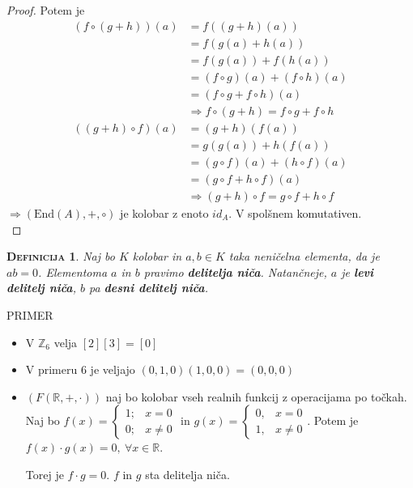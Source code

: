 \documentclass[a4paper,12pt]{article}
\newtheorem*{definicija}{\textsc{Definicija}}
\begin{document}
\begin{proof}
Potem je 
\begin{align*}
(f\circ(g+h))(a) & = f((g+h)(a)) \\
&= f(g(a)+h(a)) \\
&= f(g(a))+f(h(a)) \\
&= (f\circ g)(a)+(f\circ h)(a) \\
&= (f\circ g+f\circ h)(a) \\
&\Rightarrow f\circ (g+h)=f\circ g+f\circ h
\end{align*}
\begin{align*}
((g+h)\circ f)(a) & = (g+h)(f(a)) \\
&=g(g(a))+h(f(a)) \\
&=(g\circ f)(a)+(h\circ f)(a)\\
&=(g\circ f+h\circ f)(a)\\
&\Rightarrow (g+h)\circ f=g\circ f + h \circ f
\end{align*}
$\Rightarrow (\text{End}(A),+,\circ)$ je kolobar z enoto $id_A$. V spolšnem komutativen.\\
\end{proof}

\newpage 

\begin{definicija}
Naj bo $K$ kolobar in $a,b\in K$ taka neničelna elementa, da je $ab=0$. Elementoma $a$ in $b$ pravimo \textbf{delitelja niča}. Natančneje, $a$ je \textbf{levi delitelj niča}, $b$ pa \textbf{desni delitelj niča}.\\
\end{definicija} 

\noindent PRIMER
\begin{itemize}
\item V $\mathbb{Z}_6$ velja $[2][3]=[0]$
\item V primeru 6 je veljajo $(0,1,0)(1,0,0)=(0,0,0)$
\item $(F(\mathbb{R},+,\cdot))$ naj bo kolobar vseh realnih funkcij z operacijama po točkah. Naj bo $f(x)=
\begin{cases}
1;& x=0 \\
0;& x\neq 0
\end{cases}$ in $g(x)=
\begin{cases}
0,&x=0 \\
1,&x\neq 0
\end{cases}$. Potem je $f(x)\cdot g(x)=0,~\forall x \in \mathbb{R}$. 

\noindent Torej je $f\cdot g=0$. $f$ in $g$ sta delitelja niča.\\
\end{itemize}
\end{document}
